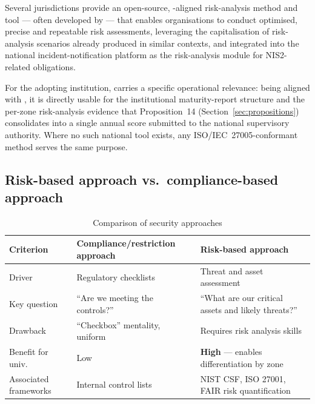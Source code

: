 Several jurisdictions provide an open-source, -aligned risk-analysis method and tool --- often developed by
 --- that enables organisations
to conduct optimised, precise and repeatable risk assessments,
leveraging the capitalisation of risk-analysis scenarios already
produced in similar contexts, and integrated into the national
incident-notification platform as the risk-analysis module for
NIS2-related obligations.

For the adopting institution,  carries a specific
operational relevance: being aligned with ,
it is directly usable for the institutional maturity-report structure
and the per-zone risk-analysis evidence that Proposition~14
(Section~\ref{sec:propositions}) consolidates into a single annual
score submitted to the national supervisory authority. Where no such
national tool exists, any ISO/IEC~27005-conformant method serves the
same purpose.

\subsection{Risk-based approach vs.\ compliance-based approach}

\begin{table}[H]
\centering
\caption{Comparison of security approaches}
\label{tab:risque-conformite}
\small
\begin{tabularx}{\textwidth}{l X X}
\toprule
\textbf{Criterion} & \textbf{Compliance/restriction approach}
    & \textbf{Risk-based approach} \\
\midrule
Driver & Regulatory checklists & Threat and asset assessment \\
\addlinespace
Key question & ``Are we meeting the controls?'' &
    ``What are our critical assets and likely threats?'' \\
\addlinespace
Drawback & ``Checkbox'' mentality, uniform &
    Requires risk analysis skills \\
\addlinespace
Benefit for univ. & Low & \textbf{High} --- enables
    differentiation by zone \\
\addlinespace
Associated frameworks & Internal control lists & NIST CSF, ISO 27001,
    FAIR risk quantification~\cite{fair} \\
\bottomrule
\end{tabularx}
\end{table}

